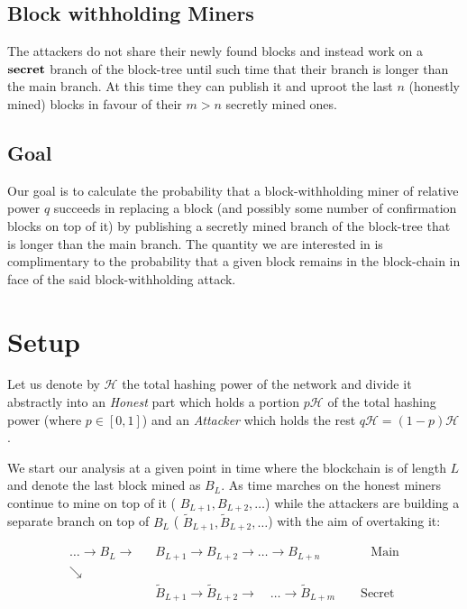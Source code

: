 \documentclass[letterpaper,12pt]{report}
\theoremstyle{plain}
\theoremstyle{definition}
\begin{document}
\subsection{Block withholding Miners}
The attackers do not share their newly found blocks and instead work on a $\bf{secret}$ branch of the block-tree until such time that their branch is longer than the main branch. At this time they can publish it and uproot the last $n$ (honestly mined) blocks in favour of their $m>n$ secretly mined ones.

\subsection{Goal}\label{subsec:goal}

Our goal is to calculate the probability that a block-withholding miner of relative power $q$ succeeds in replacing a block (and possibly some number of confirmation blocks on top of it) by publishing a secretly mined branch of the block-tree that is longer than the main branch.
The quantity we are interested in is complimentary to the probability that a given block remains in the block-chain in face of the said block-withholding attack.
 

\section{Setup}\label{calcsetup}
Let us denote by $\mathcal{H}$ the total hashing power of the network and divide it abstractly into an \emph{Honest} part which holds a portion $p\mathcal{H}$ of the total hashing power (where $p \in [0,1]$) and an \emph{Attacker} which holds the rest $q\mathcal{H}=(1-p)\mathcal{H}$. 

We start our analysis at a given point in time where the blockchain is of length $L$ and denote the last block mined as $\mathit{B}_L$. As time marches on the honest miners continue to mine on top of it ( $\mathit{B}_{L+1}, \mathit{B}_{L+2}, \dots$) while the attackers are building a separate branch on top of $\mathit{B}_L$ ( $\mathit{\tilde{B}}_{L+1}, \mathit{\tilde{B}}_{L+2}, \dots$) with the aim of overtaking it:

\begin{eqnarray}\label{blockwithholdingchain}
 \dots \rightarrow \mathit{B}_L\rightarrow &\mathit{B}_{L+1}\rightarrow\mathit{B}_{L+2}
\rightarrow\dots\rightarrow\mathit{B}_{L+n} \qquad\qquad \mathrm{Main}\\\nonumber
\searrow & \\\nonumber
\qquad \qquad \qquad & \widetilde{\mathit{B}}_{L+1}\rightarrow\widetilde{\mathit{B}}_{L+2}
\longrightarrow \quad \dots \longrightarrow\widetilde{\mathit{B}}_{L+m}\qquad \mathrm{Secret}
\end{eqnarray}
\end{document}
